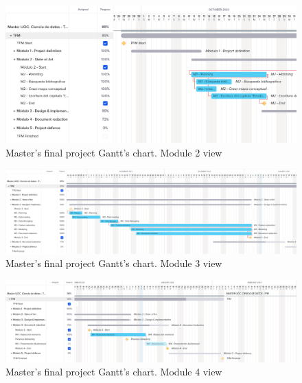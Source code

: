 \begin{figure}[H]
    \begin{center}
        \includegraphics[scale=0.50]{images/Introduccion/Planning/TFM_M2_Planing.png}
        \caption{Master's final project Gantt's chart. Module 2 view}
    \label{fig:Gantt_M2}    
    \end{center}
\end{figure}

\begin{figure}[H]
    \begin{center}
        \includegraphics[scale=0.28]{images/Introduccion/Planning/TFM_M3_Planing.png}
        \caption{Master's final project Gantt's chart. Module 3 view}
    \label{fig:Gantt_M3}    
    \end{center}
\end{figure}

\hspace{1cm}
\hspace{1cm}
\hspace{1cm}
\hspace{1cm}
\hspace{1cm}

\begin{figure}[H]
    \begin{center}
        \includegraphics[scale=0.32]{images/Introduccion/Planning/TFM_M4_Planing.png}
        \caption{Master's final project Gantt's chart. Module 4 view}
    \label{fig:Gantt_M4}    
    \end{center}
\end{figure}